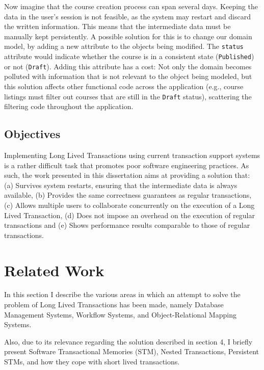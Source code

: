 \documentclass{llncs}
\begin{document}
Now imagine that the course creation process can span several
days. Keeping the data in the user's session is not feasible, as the
system may restart and discard the written information. This means
that the intermediate data must be manually kept persistently.  A
possible solution for this is to change our domain model, by adding a
new attribute to the objects being modified. The \texttt{status}
attribute would indicate whether the course is in a consistent state
(\texttt{Published}) or not (\texttt{Draft}). Adding this attribute
has a cost: Not only the domain becomes polluted with information that
is not relevant to the object being modeled, but this solution affects
other functional code across the application (e.g., course listings
must filter out courses that are still in the \texttt{Draft} status),
scattering the filtering code throughout the application.

\subsection{Objectives}

Implementing Long Lived Transactions using current transaction support
systems is a rather difficult task that promotes poor software
engineering practices. As such, the work presented in this
dissertation aims at providing a solution that: (a) Survives system
restarts, ensuring that the intermediate data is always available, (b)
Provides the same correctness guarantees as regular transactions, (c)
Allows multiple users to collaborate concurrently on the execution of
a Long Lived Transaction, (d) Does not impose an overhead on the
execution of regular transactions and (e) Shows performance results
comparable to those of regular transactions.



\section{Related Work}
\label{chap:related}

In this section I describe the various areas in which an attempt to
solve the problem of Long Lived Transactions has been made, namely
Database Management Systems, Workflow Systems, and Object-Relational
Mapping Systems.

Also, due to its relevance regarding the solution described in section
4, I briefly present Software Transactional Memories (STM), Nested
Transactions, Persistent STMs, and how they cope with short lived
transactions.
\end{document}
